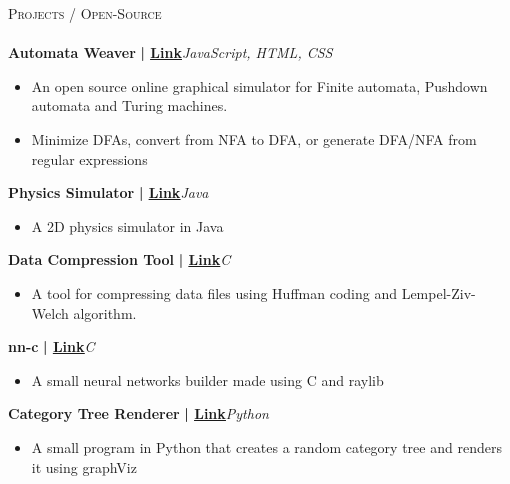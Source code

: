 \documentclass[a4paper]{article}
\newcommand{\lineunder} {
    \vspace*{-8pt} \\
    \hspace*{-18pt} \hrulefill \\
}
\newcommand{\header} [1] {
    {\hspace*{-18pt}\vspace*{6pt} \textsc{#1}}
    \vspace*{-6pt} \lineunder
}
\begin{document}
      \header{Projects / Open-Source}
      \vspace{2mm}
      {\textbf{Automata Weaver}}\textbf{ | \href{https://github.com/syedhuzaif199/automata-weaver}{\underline{Link}}}\hfill{\sl JavaScript, HTML, CSS}\\
          \vspace{-1mm}
\begin{itemize} \itemsep -3pt
\item  An open source online graphical simulator for Finite automata, Pushdown automata and Turing machines.
\item  Minimize DFAs, convert from NFA to DFA, or generate DFA/NFA from regular expressions
\end{itemize}
          \vspace*{3mm}
      {\textbf{Physics Simulator}}\textbf{ | \href{https://github.com/syedhuzaif199/physics-simulator}{\underline{Link}}}\hfill{\sl Java}\\
          \vspace{-2mm}
\begin{itemize} \itemsep -3pt
\item[] A 2D physics simulator in Java
\end{itemize}
          \vspace*{3mm}
      {\textbf{Data Compression Tool}}\textbf{ | \href{https://github.com/syedhuzaif199/data-compression-tool}{\underline{Link}}}\hfill{\sl C}\\
          \vspace{-2mm}
\begin{itemize} \itemsep -3pt
\item[] A tool for compressing data files using Huffman coding and Lempel-Ziv-Welch algorithm.
\end{itemize}
          \vspace*{3mm}
      {\textbf{nn-c}}\textbf{ | \href{https://github.com/syedhuzaif199/nn-c}{\underline{Link}}}\hfill{\sl C}\\
          \vspace{-2mm}
\begin{itemize} \itemsep -3pt
\item[] A small neural networks builder made using C and raylib
\end{itemize}
          \vspace*{3mm}
      {\textbf{Category Tree Renderer}}\textbf{ | \href{https://github.com/syedhuzaif199/category-tree}{\underline{Link}}}\hfill{\sl Python}\\
          \vspace{-2mm}
\begin{itemize} \itemsep -3pt
\item[] A small program in Python that creates a random category tree and renders it using graphViz
\end{itemize}
\end{document}
